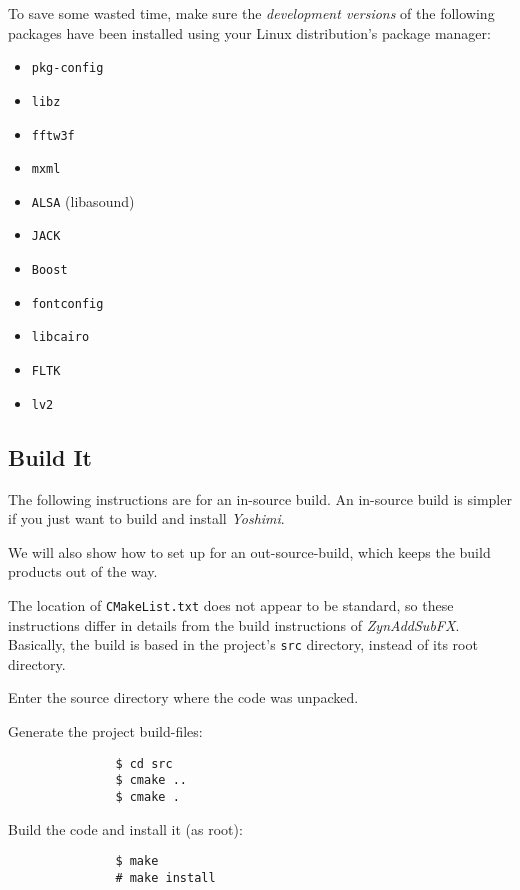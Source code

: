    To save some wasted time, make sure the \textsl{development versions}
   of the following packages have been installed using your Linux
   distribution's package manager:

   \begin{itemize}
      \item \texttt{pkg-config}
      \item \texttt{libz}
      \item \texttt{fftw3f}
      \item \texttt{mxml}
      \item \texttt{ALSA} (libasound)
      \item \texttt{JACK}
      \item \texttt{Boost}
      \item \texttt{fontconfig}
      \item \texttt{libcairo}
      \item \texttt{FLTK}
      \item \texttt{lv2}
   \end{itemize}

\subsection{Build It}
\label{sec:yoshimi_build_it}

   The following instructions are for an in-source build.  An in-source
   build is simpler if you just want to build and install \textsl{Yoshimi}.

   We will also show how to set up for an out-source-build, which keeps
   the build products out of the way.

   The location of \texttt{CMakeList.txt} does not appear to be standard, so
   these instructions differ in details from the build instructions of
   \textsl{ZynAddSubFX}.  Basically, the build is based in the project's
   \texttt{src} directory, instead of its root directory.

   \begin{enumber}
      \item Enter the source directory where the code was unpacked.
      \item Generate the project build-files:
            \begin{verbatim}
               $ cd src
               $ cmake ..
               $ cmake .
            \end{verbatim}
      \item Build the code and install it (as root):
            \begin{verbatim}
               $ make
               # make install
            \end{verbatim}
   \end{enumber}

